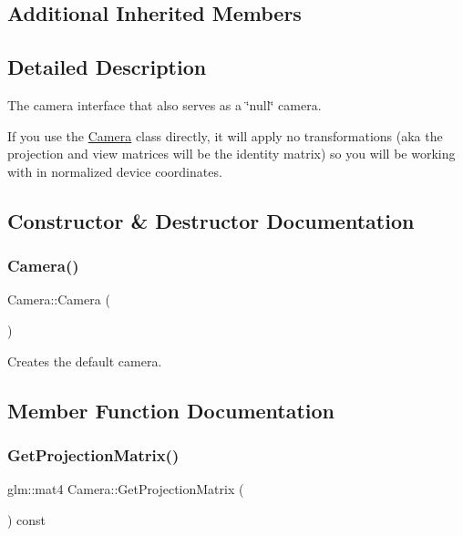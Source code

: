 \subsection*{Additional Inherited Members}


\subsection{Detailed Description}
The camera interface that also serves as a \char`\"{}null\char`\"{} camera.

If you use the \hyperlink{class_camera}{Camera} class directly, it will apply no transformations (aka the projection and view matrices will be the identity matrix) so you will be working with in normalized device coordinates.

\subsection{Constructor \& Destructor Documentation}
\hypertarget{class_camera_a01f94c3543f56ede7af49dc778f19331}{}\label{class_camera_a01f94c3543f56ede7af49dc778f19331}
\subsubsection{\texorpdfstring{Camera()}{Camera()}}
{\footnotesize\ttfamily Camera\+::\+Camera (\begin{DoxyParamCaption}{ }\end{DoxyParamCaption})}



Creates the default camera.



\subsection{Member Function Documentation}
\hypertarget{class_camera_af6f4415189deaff158ba86f0b3527a30}{}\label{class_camera_af6f4415189deaff158ba86f0b3527a30}
\subsubsection{\texorpdfstring{Get\+Projection\+Matrix()}{GetProjectionMatrix()}}
{\footnotesize\ttfamily glm\+::mat4 Camera\+::\+Get\+Projection\+Matrix (\begin{DoxyParamCaption}{ }\end{DoxyParamCaption}) const\hspace{0.3cm}{\ttfamily [virtual]}}



